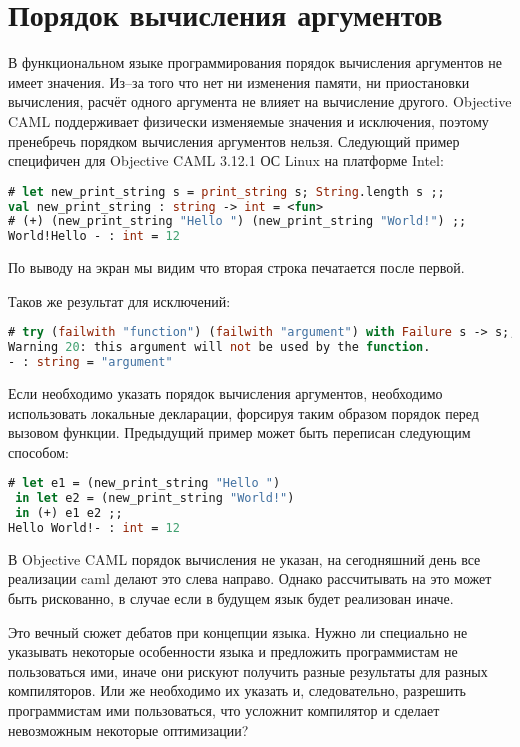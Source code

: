 \section{Порядок вычисления аргументов}
\label{sec:order_of_evaluation_of_arguments}

В функциональном языке программирования порядок вычисления аргументов не имеет
значения. Из–за того что нет ни изменения памяти, ни приостановки вычисления,
расчёт одного аргумента не влияет на вычисление другого. Objective CAML
поддерживает физически изменяемые значения и исключения, поэтому пренебречь
порядком вычисления аргументов нельзя. Следующий пример специфичен для Objective
CAML 3.12.1 ОС Linux на платформе Intel:

\begin{lstlisting}[language=OCaml]
# let new_print_string s = print_string s; String.length s ;;
val new_print_string : string -> int = <fun>
# (+) (new_print_string "Hello ") (new_print_string "World!") ;;
World!Hello - : int = 12
\end{lstlisting}

По выводу на экран мы видим что вторая строка печатается после первой.

Таков же результат для исключений:

\begin{lstlisting}[language=OCaml]
# try (failwith "function") (failwith "argument") with Failure s -> s;;
Warning 20: this argument will not be used by the function.
- : string = "argument"
\end{lstlisting}

Если необходимо указать порядок вычисления аргументов, необходимо использовать
локальные декларации, форсируя таким образом порядок перед вызовом функции.
Предыдущий пример может быть переписан следующим способом:

\begin{lstlisting}[language=OCaml]
# let e1 = (new_print_string "Hello ")
 in let e2 = (new_print_string "World!")
 in (+) e1 e2 ;;
Hello World!- : int = 12
\end{lstlisting}

В Objective CAML порядок вычисления не указан, на сегодняшний день все
реализации caml делают это слева направо. Однако рассчитывать на это может быть
рискованно, в случае если в будущем язык будет реализован иначе.

Это вечный сюжет дебатов при концепции языка. Нужно ли специально не указывать
некоторые особенности языка и предложить программистам не пользоваться ими,
иначе они рискуют получить разные результаты для разных компиляторов. Или же
необходимо их указать и, следовательно, разрешить программистам ими
пользоваться, что усложнит компилятор и сделает невозможным некоторые
оптимизации?
